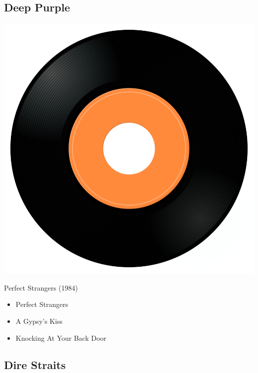 \subsection{Deep Purple}

\begin{minipage}[t]{0.25\textwidth}
\captionsetup{type=figure}
\includegraphics[width=\textwidth]{Images/cover.png}
\caption*{Perfect Strangers (1984)}
\end{minipage}
\begin{minipage}[t]{0.25\textwidth}\vspace{0pt}
\begin{itemize}[nosep,leftmargin=1em,labelwidth=*,align=left]
	\setlength{\itemsep}{0pt}
	\item Perfect Strangers 
	\item A Gypsy's Kiss
	\item Knocking At Your Back Door
\end{itemize}
\end{minipage}

\subsection{Dire Straits}

